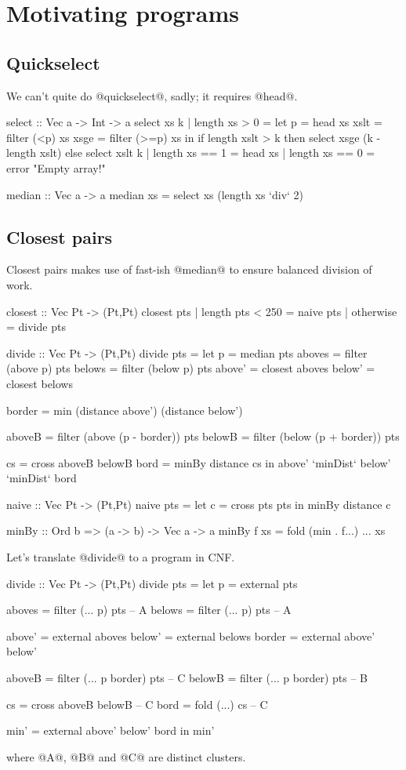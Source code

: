 \section{Motivating programs}
\subsection{Quickselect}
We can't quite do @quickselect@, sadly; it requires @head@.
\begin{code}
select :: Vec a -> Int -> a
select xs k
 | length xs > 0
 = let p    = head xs 
       xslt = filter  (<p) xs
       xsge = filter (>=p) xs
   in  if     length xslt > k
       then   select xsge (k - length xslt)
       else   select xslt  k
 | length xs == 1
 = head xs
 | length xs == 0
 = error "Empty array!"

median :: Vec a -> a
median xs
 = select xs (length xs `div` 2)
\end{code}

\subsection{Closest pairs}
Closest pairs makes use of fast-ish @median@ to ensure balanced division of work.
\begin{code}
closest :: Vec Pt -> (Pt,Pt)
closest pts
 | length pts < 250
 = naive pts
 | otherwise
 = divide pts

divide :: Vec Pt -> (Pt,Pt)
divide pts
 = let p      = median pts
       aboves = filter (above p) pts
       belows = filter (below p) pts
       above' = closest aboves
       below' = closest belows

       border = min (distance above') (distance below')

       aboveB = filter (above (p - border)) pts
       belowB = filter (below (p + border)) pts

       cs     = cross aboveB belowB
       bord   = minBy distance cs
   in  above' `minDist` below' `minDist` bord


naive :: Vec Pt -> (Pt,Pt)
naive pts
 = let c = cross pts pts
   in  minBy distance c

minBy :: Ord b => (a -> b) -> Vec a -> a
minBy f xs
 = fold (min . f...) ... xs
\end{code}

Let's translate @divide@ to a program in CNF.
\begin{code}
divide :: Vec Pt -> (Pt,Pt)
divide pts
 = let p      = external pts

       aboves = filter (... p) pts          -- A
       belows = filter (... p) pts          -- A

       above' = external aboves
       below' = external belows
       border = external above' below'

       aboveB = filter (... p border) pts   -- C
       belowB = filter (... p border) pts   -- B

       cs     = cross  aboveB belowB        -- C
       bord   = fold   (...) cs             -- C

       min'   = external above' below' bord
   in  min'
\end{code}
where @A@, @B@ and @C@ are distinct clusters.


